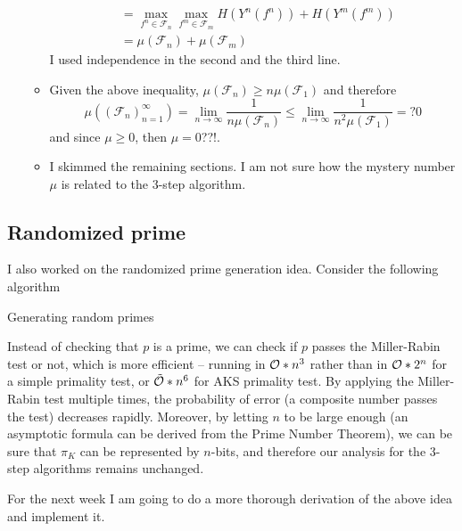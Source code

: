 \documentclass{article}
\begin{document}
\begin{itemize}
\begin{itemize}
\begin{align*}
			                                     & = \max_{f^{n} \in \mathcal{F}_n} \max_{f^m \in \mathcal{F}_m } H(Y^{n }(f^{n}) )+ H( Y^m(f^m)) \\
			                                     & = \mu(\mathcal{F}_n) + \mu(\mathcal{F}_m)
		            \end{align*}
		            I used independence in the second and the third line.
		      \item Given the above inequality, \(\mu(\mathcal{F}_n) \geq n \mu(\mathcal{F}_1)\) and therefore
		            \begin{equation*}
			            \mu((\mathcal{F}_n)_{n = 1}^{\infty}) = \lim_{n \to \infty} \dfrac{1}{n \mu(\mathcal{F}_{n})} \leq \lim_{n \to \infty} \dfrac{1}{n^2 \mu(\mathcal{F}_{1})} =? 0
		            \end{equation*}
		            and since \(\mu \geq 0\), then \(\mu = 0\)??!.
		      \item I skimmed the remaining sections. I am not sure how the mystery number \(\mu\) is related to the 3-step algorithm.
	      \end{itemize}
\end{itemize}
\subsection{Randomized prime}
I also worked on the randomized prime generation idea. Consider the following algorithm
\begin{algorithm}
	\DontPrintSemicolon
	\Return{\(\perp\)}
	\caption{Generating random primes}
\end{algorithm}
Instead of checking that \(p\) is a prime, we can check if \(p\) passes the Miller-Rabin test or not, which is more efficient -- running in \(\bigO{n^3}\) rather than in \(\bigO{2^n}\) for a simple primality test, or \(\logBigO{n^6}\) for AKS primality test. By applying the Miller-Rabin test multiple times, the probability of error (a composite number passes the test) decreases rapidly. Moreover, by letting \(n\) to be large enough (an asymptotic formula can be derived from the Prime Number Theorem), we can be sure that \(\pi_K\) can be represented by \(n\)-bits, and therefore our analysis for the 3-step algorithms remains unchanged.

For the next week I am going to do a more thorough derivation of the above idea and implement it.
\end{document}
